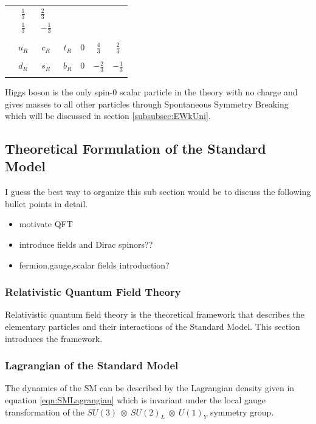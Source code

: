 \begin{table}
\begin{center}
\begin{tabular}{| c | c | c | c | c | c | c |}
					&$\begin{matrix} \frac{1}{3} \\[0.15cm] \frac{1}{3} \end{matrix}$
					&$\begin{matrix} \frac{2}{3} \\[0.15cm] -\frac{1}{3} \end{matrix}$\\
				& & & & & & \\
					& $u_{R}$ & $c_{R}$ &  $t_{R}$ & $0$ & $\frac{4}{3}$  & $\frac{2}{3}$ \\
					& & & & & & \\
					& $d_{R}$ & $s_{R}$ &  $b_{R}$ & $0$ & $-\frac{2}{3}$  & $-\frac{1}{3}$ \\
& & & & & & \\
\hline
\end{tabular}
\label{tab:Fermions}
\end{center}
\end{table}

Higgs boson is the only spin-0 scalar particle in the theory with no charge and gives masses to all other particles through Spontaneous Symmetry Breaking which will be discussed in section \ref{subsubsec:EWkUni}.

\subsection{Theoretical Formulation of the Standard Model}
\label{subsec:TheoryFormulation}
I guess the best way to organize this sub section would be to discuss the following bullet points in detail.
\begin{itemize}
\item{motivate QFT}
\item{introduce fields and Dirac spinors??}
\item{fermion,gauge,scalar fields introduction? }
\end{itemize}

\subsubsection{Relativistic Quantum Field Theory}
\label{subsubsec:RelQFT}
Relativistic quantum field theory is the theoretical framework that describes the elementary particles and their interactions of the Standard Model. This section introduces the framework. 

\subsubsection{Lagrangian of the Standard Model}
\label{subsubsec:SMLag}
The dynamics of the SM can be described by the Lagrangian density given in equation \ref{eqn:SMLagrangian} which is invariant under the local gauge transformation of the $SU(3)~\otimes~SU(2)_{L}~\otimes~U(1)_{Y}$ symmetry group. 

